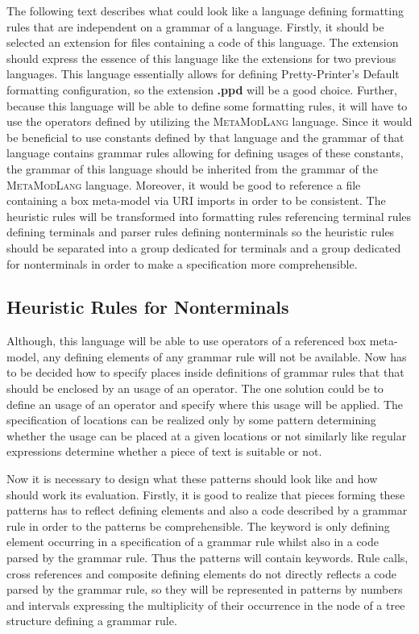 \documentclass[12pt,notitlepage,a4paper]{report}
\begin{document}
The following text describes what could look like a language defining formatting rules that are independent on a grammar of a language. Firstly, it should be selected an extension for files containing a code of this language. The extension should express the essence of this language like the extensions for two previous languages. This language essentially allows for defining Pretty-Printer's Default formatting configuration, so the extension \textbf{.ppd} will be a good choice. Further, because  this language will be able to define some formatting rules, it will have to use the operators defined by utilizing the \textsc{MetaModLang} language. Since it would be beneficial to use constants defined by that language and the grammar of that language contains grammar rules allowing for defining usages of these constants, the grammar of this language should be inherited from the grammar of the \textsc{MetaModLang} language. Moreover, it would be good to reference a file containing a box meta-model via URI imports in order to be consistent. The heuristic rules will be transformed into formatting rules referencing terminal rules defining terminals and parser rules defining nonterminals so the heuristic rules should be separated into a group dedicated for terminals and a group dedicated for nonterminals in order to make a specification more comprehensible.

\subsection{Heuristic Rules for Nonterminals}

Although, this language will  be able to use operators of a referenced box meta-model, any defining elements of any grammar rule will not be available. Now has to be decided how to specify places inside definitions of grammar rules that that should be enclosed by an usage of an operator. The one solution could be to define an usage of an operator and specify where this usage will be applied. The specification of locations  can be realized only by some pattern determining whether the usage can be placed at a given locations or not similarly like regular expressions determine whether a piece of text is suitable or not.

Now it is necessary to design what these patterns should look like and how should work its evaluation. Firstly, it is good to realize that pieces forming these patterns has to reflect defining elements and also a code described by a grammar rule in order to the patterns be comprehensible. The keyword is only defining element occurring in a specification of a grammar rule whilst also in a code parsed by the grammar rule. Thus the patterns will contain keywords. Rule calls, cross references and composite defining elements do not directly reflects a code parsed by the grammar rule, so they will be represented in patterns by numbers and intervals expressing the multiplicity of their occurrence in the node of a tree structure defining a grammar rule. 
\end{document}

